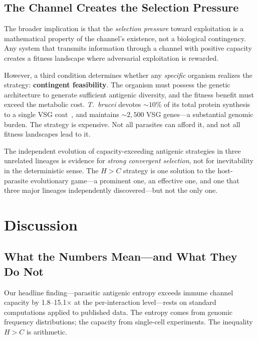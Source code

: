 \documentclass[twocolumn,10pt]{article}
\begin{document}
\subsection{The Channel Creates the Selection Pressure}

The broader implication is that the \emph{selection pressure} toward exploitation is a mathematical property of the channel's existence, not a biological contingency.  Any system that transmits information through a channel with positive capacity creates a fitness landscape where adversarial exploitation is rewarded.

However, a third condition determines whether any \emph{specific} organism realizes the strategy: \textbf{contingent feasibility}.  The organism must possess the genetic architecture to generate sufficient antigenic diversity, and the fitness benefit must exceed the metabolic cost.  \textit{T.~brucei} devotes ${\sim}10\%$ of its total protein synthesis to a single VSG coat~\citep{pays2004}, and maintains ${\sim}2{,}500$ VSG genes---a substantial genomic burden.  The strategy is expensive.  Not all parasites can afford it, and not all fitness landscapes lead to it.

The independent evolution of capacity-exceeding antigenic strategies in three unrelated lineages is evidence for \emph{strong convergent selection}, not for inevitability in the deterministic sense.  The $H > C$ strategy is one solution to the host-parasite evolutionary game---a prominent one, an effective one, and one that three major lineages independently discovered---but not the only one.

\section{Discussion}
\label{sec:discussion}

\subsection{What the Numbers Mean---and What They Do Not}

Our headline finding---parasitic antigenic entropy exceeds immune channel capacity by 1.8--15.1$\times$ at the per-interaction level---rests on standard computations applied to published data.  The entropy comes from genomic frequency distributions; the capacity from single-cell experiments.  The inequality $H > C$ is arithmetic.
\end{document}
